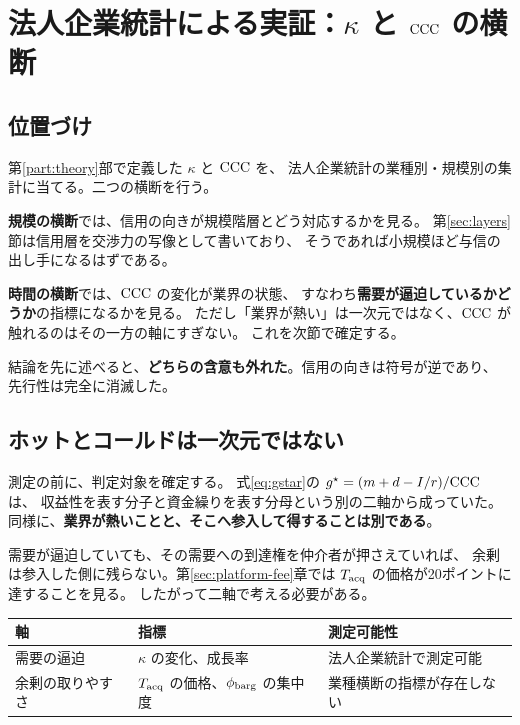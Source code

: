 \chapter{法人企業統計による実証：\texorpdfstring{$\kappa$}{κ} と \texorpdfstring{$\mathrm{CCC}$}{CCC} の横断}
\label{part:industry}

\section{位置づけ}

第\ref{part:theory}部で定義した $\kappa$ と $\mathrm{CCC}$ を、
法人企業統計の業種別・規模別の集計に当てる。二つの横断を行う。

\textbf{規模の横断}では、信用の向きが規模階層とどう対応するかを見る。
第\ref{sec:layers}節は信用層を交渉力の写像として書いており、
そうであれば小規模ほど与信の出し手になるはずである。

\textbf{時間の横断}では、$\mathrm{CCC}$ の変化が業界の状態、
すなわち\textbf{需要が逼迫しているかどうか}の指標になるかを見る。
ただし「業界が熱い」は一次元ではなく、$\mathrm{CCC}$ が触れるのはその一方の軸にすぎない。
これを次節で確定する。

結論を先に述べると、\textbf{どちらの含意も外れた}。信用の向きは符号が逆であり、
先行性は完全に消滅した。

\section{ホットとコールドは一次元ではない}

測定の前に、判定対象を確定する。
式\eqref{eq:gstar}の $g^\star=(m+d-I/r)/\mathrm{CCC}$ は、
収益性を表す分子と資金繰りを表す分母という別の二軸から成っていた。
同様に、\textbf{業界が熱いことと、そこへ参入して得することは別である}。

需要が逼迫していても、その需要への到達権を仲介者が押さえていれば、
余剰は参入した側に残らない。第\ref{sec:platform-fee}章では
$T_{\rm acq}$ の価格が20ポイントに達することを見る。
したがって二軸で考える必要がある。

\begin{center}
\begin{tabularx}{\textwidth}{@{}llX@{}}
\toprule
軸 & 指標 & 測定可能性 \\
\midrule
需要の逼迫 & $\kappa$ の変化、成長率 & 法人企業統計で測定可能 \\
余剰の取りやすさ & $T_{\rm acq}$ の価格、$\phi_{\rm barg}$ の集中度 & 業種横断の指標が存在しない \\
\bottomrule
\end{tabularx}
\label{tab:hotcold-axes}
\end{center}

